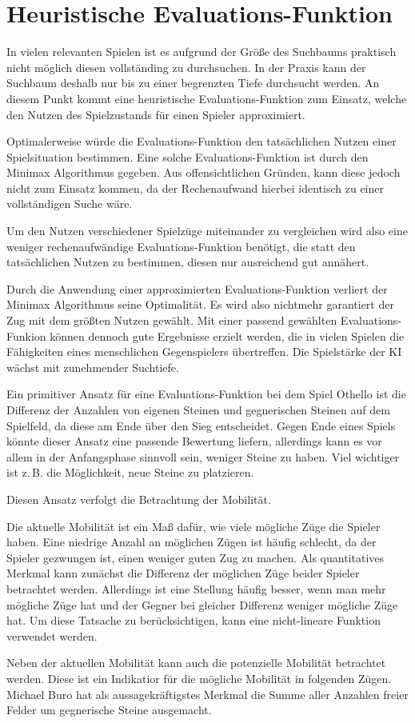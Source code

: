 \section{Heuristische Evaluations-Funktion}

In vielen relevanten Spielen ist es aufgrund der Größe des Suchbaums praktisch nicht möglich diesen vollständing zu
durchsuchen. In der Praxis kann der Suchbaum deshalb nur bis zu einer begrenzten Tiefe durchsucht werden. An diesem
Punkt kommt eine heuristische Evaluations-Funktion zum Einsatz, welche den Nutzen des Spielzustands für einen Spieler
approximiert.
\cite[S.~171]{ai2010russel}

Optimalerweise würde die Evaluations-Funktion den tatsächlichen Nutzen einer Spielsituation bestimmen. Eine solche
Evaluations-Funktion ist durch den Minimax Algorithmus gegeben. Aus offensichtlichen Gründen, kann diese jedoch nicht
zum Einsatz kommen, da der Rechenaufwand hierbei identisch zu einer vollständigen Suche wäre.

Um den Nutzen verschiedener Spielzüge miteinander zu vergleichen wird also eine weniger rechenaufwändige
Evaluations-Funktion benötigt, die statt den tatsächlichen Nutzen zu bestimmen, diesen nur ausreichend gut annähert.

Durch die Anwendung einer approximierten Evaluations-Funktion verliert der Minimax Algorithmus seine Optimalität. Es
wird also nichtmehr garantiert der Zug mit dem größten Nutzen gewählt. Mit einer passend gewählten Evaluations-Funkion
können dennoch gute Ergebnisse erzielt werden, die in vielen Spielen die Fähigkeiten eines menschlichen Gegenspielers
übertreffen. Die Spielstärke der KI wächst mit zunehmender Suchtiefe.


Ein primitiver Ansatz für eine Evaluations-Funktion bei dem Spiel Othello ist die Differenz der Anzahlen von eigenen
Steinen und gegnerischen Steinen auf dem Spielfeld, da diese am Ende über den Sieg entscheidet. Gegen Ende eines Spiels
könnte dieser Ansatz eine passende Bewertung liefern, allerdings kann es vor allem in der Anfangsphase sinnvoll sein,
weniger Steine zu haben. Viel wichtiger ist z.\,B. die Möglichkeit, neue Steine zu platzieren.

Diesen Ansatz verfolgt die Betrachtung der Mobilität.

Die aktuelle Mobilität ist ein Maß dafür, wie viele mögliche Züge die Spieler haben. Eine niedrige Anzahl an möglichen
Zügen ist häufig schlecht, da der Spieler gezwungen ist, einen weniger guten Zug zu machen. Als quantitatives Merkmal
kann zunächst die Differenz der möglichen Züge beider Spieler betrachtet werden. Allerdings ist eine Stellung häufig
besser, wenn man mehr mögliche Züge hat und der Gegner bei gleicher Differenz weniger mögliche Züge hat. Um diese
Tatsache zu berücksichtigen, kann eine nicht-lineare Funktion verwendet werden.
\cite[S. 7]{evaluationfunctions}

Neben der aktuellen Mobilität kann auch die potenzielle Mobilität betrachtet werden. Diese ist ein Indikatior für die
mögliche Mobilität in folgenden Zügen. Michael Buro hat als aussagekräftigstes Merkmal die Summe aller Anzahlen freier
Felder um gegnerische Steine ausgemacht.
\cite[S. 8f.]{evaluationfunctions}
